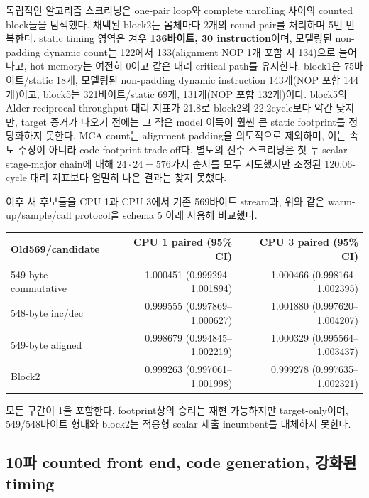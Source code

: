 \documentclass[11pt,a4paper]{article}
\begin{document}
독립적인 알고리즘 스크리닝은 one-pair loop와 complete unrolling 사이의
counted block들을 탐색했다.  채택된 block2는 몸체마다 2개의
round-pair를 처리하며 5번 반복한다.  static timing 영역은 겨우
\textbf{136바이트, 30 instruction}이며, 모델링된 non-padding dynamic
count는 122에서 133(alignment NOP 1개 포함 시 134)으로 늘어나고, hot
memory는 여전히 0이고 같은 대리 critical path를 유지한다.  block1은
75바이트/static 18개, 모델링된 non-padding dynamic instruction
143개(NOP 포함 144개)이고, block5는 321바이트/static 69개, 131개(NOP
포함 132개)이다.  block5의 Alder reciprocal-throughput 대리 지표가
21.8로 block2의 22.2cycle보다 약간 낮지만, target 증거가 나오기 전에는
그 작은 model 이득이 훨씬 큰 static footprint를 정당화하지 못한다.  MCA
count는 alignment padding을 의도적으로 제외하며, 이는 속도 주장이
아니라 code-footprint trade-off다.  별도의 전수 스크리닝은 첫 두 scalar
stage-major chain에 대해 $24\mathbin{\cdot}24=576$가지 순서를 모두
시도했지만 조정된 120.06-cycle 대리 지표보다 엄밀히 나은 결과는 찾지
못했다.

이후 새 후보들을 CPU 1과 CPU 3에서 기존 569바이트 stream과, 위와 같은
warm-up/sample/call protocol을 schema 5 아래 사용해 비교했다.

\begin{center}
\small
\begin{tabular}{lrr}
\toprule
Old569/candidate & CPU 1 paired (95\% CI) & CPU 3 paired (95\% CI) \\
\midrule
549-byte commutative & 1.000451 (0.999294--1.001894) & 1.000466 (0.998164--1.002395) \\
548-byte inc/dec & 0.999555 (0.997869--1.000627) & 1.001880 (0.997620--1.004207) \\
549-byte aligned & 0.998679 (0.994845--1.002219) & 1.000329 (0.995564--1.003437) \\
Block2 & 0.999263 (0.997061--1.001998) & 0.999278 (0.997635--1.002321) \\
\bottomrule
\end{tabular}
\end{center}

모든 구간이 1을 포함한다.  footprint상의 승리는 재현 가능하지만
target-only이며, 549/548바이트 형태와 block2는 적응형 scalar 제출
incumbent를 대체하지 못한다.

\subsection{10파 counted front end, code generation, 강화된 timing}
\end{document}
